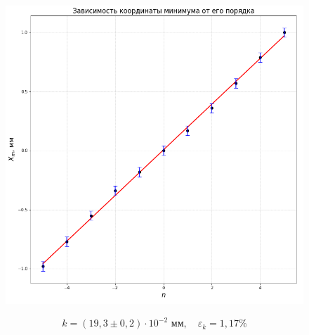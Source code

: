 \documentclass[a4paper,12pt]{article}
\begin{document}
\newpage
\begin{figure}[H]\label{fig: Fraunhofer, X_m(m)}
    \centering
    \includegraphics[width = \textwidth]{x_m(m).png}
\end{figure}
\[k = (19,3 \pm 0,2)\cdot 10^{-2} \text{ мм}, \quad \varepsilon_k = 1,17\%\]

\newpage

\end{document}
